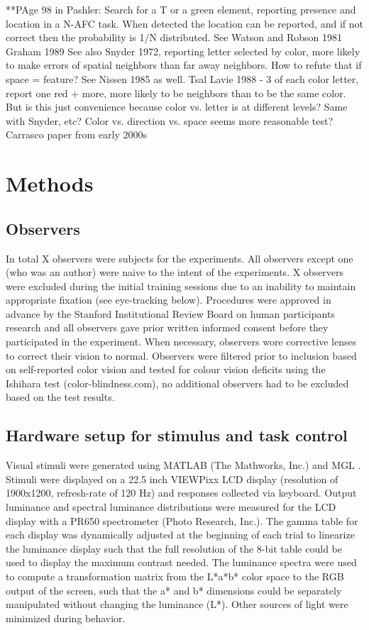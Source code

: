 \documentclass{report}
\begin{document}
**PAge 98 in Pashler:
Search for a T or a green element, reporting presence and location in a N-AFC task. When detected the location can be reported, and if not correct then the probability is 1/N distributed. 
See Watson and Robson 1981
Graham 1989
See also Snyder 1972, reporting letter selected by color, more likely to make errors of spatial neighbors than far away neighbors. How to refute that if space = feature? See Nissen 1985 as well.
Tsal Lavie 1988 - 3 of each color letter, report one red + more, more likely to be neighbors than to be the same color. But is this just convenience because color vs. letter is at different levels? Same with Snyder, etc? Color vs. direction vs. space seems more reasonable test?
Carrasco paper from early 2000s


\section{Methods}

\subsection{Observers}
In total X observers were subjects for the experiments. All observers except one (who was an author) were naive to the intent of the experiments. X observers were excluded during the initial training sessions due to an inability to maintain appropriate fixation (see eye-tracking below). Procedures were approved in advance by the Stanford Institutional Review Board on human participants research and all observers gave prior written informed consent before they participated in the experiment. When necessary, observers wore corrective lenses to correct their vision to normal. Observers were filtered prior to inclusion based on self-reported color vision and tested for colour vision deficits using the Ishihara test (color-blindness.com), no additional observers had to be excluded based on the test results. 

\subsection{Hardware setup for stimulus and task control}

Visual stimuli were generated using MATLAB (The Mathworks, Inc.) and MGL \citep{Gardner2018-uq}. Stimuli were displayed on a 22.5 inch VIEWPixx LCD display (resolution of 1900x1200, refresh-rate of 120 Hz) and responses collected via keyboard. Output luminance and spectral luminance distributions were measured for the LCD display with a PR650 spectrometer (Photo Research, Inc.). The gamma table for each display was dynamically adjusted at the beginning of each trial to linearize the luminance display such that the full resolution of the 8-bit table could be used to display the maximum contrast needed. The luminance spectra were used to compute a transformation matrix from the L*a*b* color space to the RGB output of the screen, such that the a* and b* dimensions could be separately manipulated without changing the luminance (L*). Other sources of light were minimized during behavior.
\end{document}
